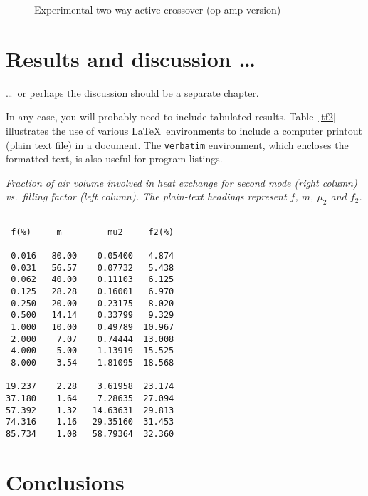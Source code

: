 \documentclass[12pt,openany,a4paper]{book}
\renewcommand{\baselinestretch}{1.2}	%
\newcommand{\tab}[1]  {Table~\ref{#1}}		%
\begin{document}
\begin{figure}[htbp]
\caption{Experimental two-way active crossover (op-amp version)}
\label{flr1}
\end{figure}


\chapter{Results and discussion \ldots}

\ldots\ or perhaps the discussion should be a separate chapter.

In any case, you will probably need to include tabulated results.
\tab{tf2} illustrates the use of various \LaTeX\ environments to
include a computer printout (plain text file) in a document.  The
\texttt{verbatim} environment, which encloses the formatted text, is
also useful for program listings.

\begin{table}\renewcommand{\baselinestretch}{1.0}
\caption{\sl Fraction of air volume involved in heat exchange for
second mode (right column) vs.\ filling factor (left column).  The
plain-text headings represent $f$, $m$, $\mu_2$ and $f_2$.}
\label{tf2}

\begin{center}
\begin{minipage}[c]{2.85in}\small\normalsize
\begin{verbatim}

 f(%)     m         mu2     f2(%)

 0.016   80.00    0.05400   4.874
 0.031   56.57    0.07732   5.438
 0.062   40.00    0.11103   6.125
 0.125   28.28    0.16001   6.970
 0.250   20.00    0.23175   8.020
 0.500   14.14    0.33799   9.329
 1.000   10.00    0.49789  10.967
 2.000    7.07    0.74444  13.008
 4.000    5.00    1.13919  15.525
 8.000    3.54    1.81095  18.568

19.237    2.28    3.61958  23.174
37.180    1.64    7.28635  27.094
57.392    1.32   14.63631  29.813
74.316    1.16   29.35160  31.453
85.734    1.08   58.79364  32.360
\end{verbatim}
\end{minipage}
\end{center}
\end{table}

\chapter{Conclusions}
\end{document}
